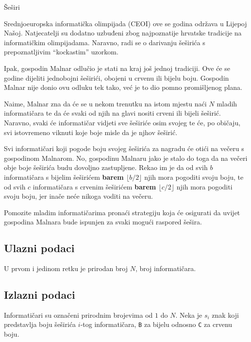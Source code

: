 \begin{statement}[
  problempoints=100,
  timelimit=1 sekunda,
  memorylimit=512 MiB,
]{Šeširi}

Srednjoeuropska informatička olimpijada (CEOI) ove se godina održava u Lijepoj
Našoj. Natjecatelji su dodatno uzbuđeni zbog najpoznatije hrvatske tradicije na
informatičkim olimpijadama. Naravno, radi se o darivanju šeširića s
prepoznatljivim ``kockastim'' uzorkom.

Ipak, gospodin Malnar odlučio je stati na kraj još jednoj tradiciji. Ove će se
godine dijeliti jednobojni šeširići, obojeni u crvenu ili bijelu boju. Gospodin
Malnar nije donio ovu odluku tek tako, već je to dio pomno promišljenog plana.

Naime, Malnar zna da će se u nekom trenutku na istom mjestu naći $N$ mladih
informatičara te da će svaki od njih na glavi nositi crveni ili bijeli
šeširić.  Naravno, svaki će informatičar vidjeti sve šeširiće osim svojeg te
će, po običaju, svi istovremeno viknuti koje boje misle da je njhov šeširić.

Svi informatičari koji pogode boju svojeg šeširića za nagradu će otići na večeru
s gospodinom Malnarom. No, gospodinu
Malnaru jako je stalo do toga da na večeri obje boje šeširića budu dovoljno
zastupljene. Rekao im je da od svih $b$ informatičara s bijelim
šeširićem \textbf{barem $\lfloor b/2 \rfloor$} njih mora pogoditi svoju boju, te od svih
$c$ informatičara s crvenim šeširićem \textbf{barem $\lfloor c/2 \rfloor$} njih mora
pogoditi svoju boju, jer inače neće nikoga voditi na večeru.

Pomozite mladim informatičarima pronaći strategiju koja će osigurati da uvijet
gospodina Malnara bude ispunjen za svaki mogući raspored šešira.

\subsection*{Ulazni podaci}
U prvom i jedinom retku je prirodan broj $N$, broj informatičara.

\subsection*{Izlazni podaci}

Informatičari su označeni prirodnim brojevima od $1$ do $N$.
Neka je $s_i$ znak koji predstavlja boju šeširića $i$-tog informatičara, \texttt{B}
za bijelu odnosno \texttt{C} za crvenu boju.


\end{statement}
